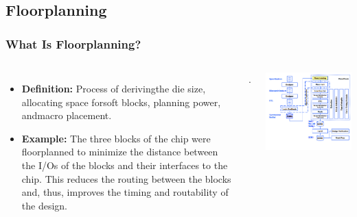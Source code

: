 \documentclass[compress]{beamer}
\begin{document}
\subsection[Floor]{Floorplanning}
\begin{frame}
	\frametitle{What Is Floorplanning?}
	\begin{columns}
		\begin{itemize}
			\item \textbf {Definition:} Process of derivingthe die size, allocating space forsoft blocks, planning power, andmacro placement.
			\item \textbf {Example:} The three blocks of the chip were floorplanned to minimize the distance between the I/Os of the blocks and their
			interfaces to the chip. This
			reduces the routing between the
			blocks and, thus, improves the timing and routability of the design.
		\end{itemize}.
		\begin{center}
			\includegraphics[width=\textwidth]{floor}
		\end{center}
	\end{columns}
\end{frame}
\end{document}
